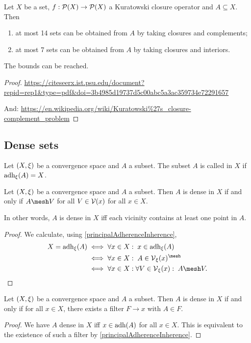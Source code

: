 \begin{theorem}
Let $X$ be a set, $f: \operatorname{\mathcal{P}}(X)\to\operatorname{\mathcal{P}}(X)$ a Kuratowski closure operator and $A\subseteq X$. Then
\begin{enumerate}
\item at most 14 sets can be obtained from $A$ by taking closures and complements;
\item at most 7 sets can be obtained from $A$ by taking closures and interiors.
\end{enumerate}
The bounds can be reached.
\end{theorem}
\begin{proof}
\url{https://citeseerx.ist.psu.edu/document?repid=rep1&type=pdf&doi=3b4985d19737d5c00abc5a3ac359734e72291657}

And: \url{https://en.wikipedia.org/wiki/Kuratowski%27s_closure-complement_problem}
\end{proof}

\subsection{Dense sets}
\begin{definition}
Let $\sSet{X, \xi}$ be a convergence space and $A$ a subset. The subset $A$ is called  in $X$ if $\operatorname{adh}_\xi(A) = X$.
\end{definition}

\begin{lemma} \label{denseIffMeshesWithAllVicinities}
Let $\sSet{X, \xi}$ be a convergence space and $A$ a subset. Then $A$ is dense in $X$ \textup{if and only if} $A\mesh V$ for all $V\in \operatorname{\mathcal{V}}(x)$ for all $x\in X$.
\end{lemma}
In other words, $A$ is dense in $X$ iff each vicinity contains at least one point in $A$.
\begin{proof}
We calculate, using \ref{principalAdherenceInherence},
\begin{align*}
X = \adh_\xi(A) &\iff \forall x\in X: \; x\in \adh_\xi(A) \\
&\iff \forall x\in X: \; A \in \vicinity_\xi(x)^\mesh \\
&\iff \forall x\in X: \forall V\in\vicinity_\xi(x): \; A \mesh V.
\end{align*}
\end{proof}

\begin{lemma} \label{convergentFiltersInDenseSet}
Let $\sSet{X, \xi}$ be a convergence space and $A$ a subset. Then $A$ is dense in $X$ \textup{if and only if} for all $x\in X$, there exists a filter $F\to x$ with $A\in F$.
\end{lemma}
\begin{proof}
We have $A$ dense in $X$ iff $x\in \operatorname{adh}(A)$ for all $x\in X$. This is equivalent to the existence of such a filter by \ref{principalAdherenceInherence}.
\end{proof}

